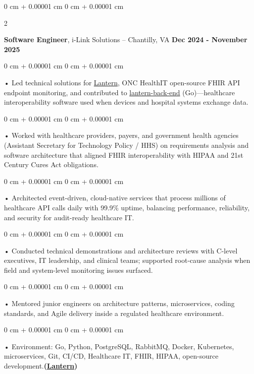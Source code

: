 \documentclass[10pt, letterpaper]{article}
\newenvironment{onecolentry}{
    \begin{adjustwidth}{
        0 cm + 0.00001 cm
    }{
        0 cm + 0.00001 cm
    }
}{
    \end{adjustwidth}
} %
\newenvironment{twocolentry}[2][]{
    \onecolentry
    \def\secondColumn{#2}
    \setcolumnwidth{\fill, 4.5 cm}
    \begin{paracol}{2}
}{
    \switchcolumn \raggedleft \secondColumn
    \end{paracol}
    \endonecolentry
} %
\begin{document}
        \vspace{0.1cm}

        \begin{twocolentry}{
            \textbf{Dec 2024 - November 2025}
        }
            \textbf{Software Engineer}, i-Link Solutions -- Chantilly, VA\end{twocolentry}


        \begin{onecolentry}
             • Led technical solutions for \href{https://lantern.healthit.gov/?tab=dashboard_tab}{Lantern}, ONC HealthIT open-source FHIR API endpoint monitoring, and contributed to \href{https://github.com/onc-healthit/lantern-back-end}{lantern-back-end} (Go)---healthcare interoperability software used when devices and hospital systems exchange data.
        \end{onecolentry}
        \begin{onecolentry}
             • Worked with healthcare providers, payers, and government health agencies (Assistant Secretary for Technology Policy / HHS) on requirements analysis and software architecture that aligned FHIR interoperability with HIPAA and 21st Century Cures Act obligations.
        \end{onecolentry}
        \begin{onecolentry}
             • Architected event-driven, cloud-native services that process millions of healthcare API calls daily with 99.9\% uptime, balancing performance, reliability, and security for audit-ready healthcare IT.
        \end{onecolentry}
        \begin{onecolentry}
             • Conducted technical demonstrations and architecture reviews with C-level executives, IT leadership, and clinical teams; supported root-cause analysis when field and system-level monitoring issues surfaced.
        \end{onecolentry}
        \begin{onecolentry}
             • Mentored junior engineers on architecture patterns, microservices, coding standards, and Agile delivery inside a regulated healthcare environment.
        \end{onecolentry}
        \begin{onecolentry}
             • Environment: Go, Python, PostgreSQL, RabbitMQ, Docker, Kubernetes, microservices, Git, CI/CD, Healthcare IT, FHIR, HIPAA, open-source development.\textbf{(\href{https://lantern.healthit.gov/?tab=dashboard_tab}{Lantern})}
        \end{onecolentry}
        \vspace{0.1cm}
\end{document}
